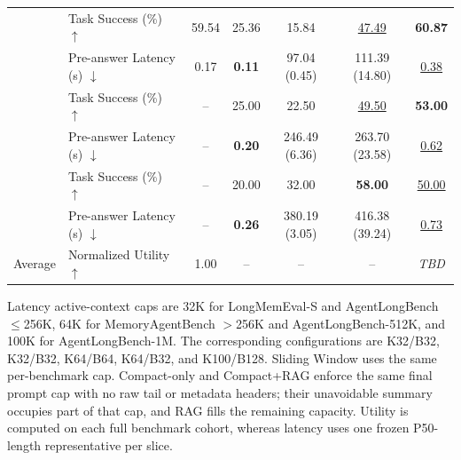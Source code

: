 \begin{table}[t]
\begin{tabular}{@{}llccccc@{}}
& Task Success (\%) $\uparrow$
& 59.54 & 25.36 & 15.84 & \underline{47.49} & \textbf{60.87} \\
& Pre-answer Latency (s) $\downarrow$
& 0.17 & \textbf{0.11} & 97.04 (0.45) & 111.39 (14.80) & \underline{0.38} \\
\midrule

& Task Success (\%) $\uparrow$
& -- & 25.00 & 22.50 & \underline{49.50} & \textbf{53.00} \\
& Pre-answer Latency (s) $\downarrow$
& -- & \textbf{0.20} & 246.49 (6.36) & 263.70 (23.58) & \underline{0.62} \\
\midrule

& Task Success (\%) $\uparrow$
& -- & 20.00 & 32.00 & \textbf{58.00} & \underline{50.00} \\
& Pre-answer Latency (s) $\downarrow$
& -- & \textbf{0.26} & 380.19 (3.05) & 416.38 (39.24) & \underline{0.73} \\
\midrule

Average
& Normalized Utility $\uparrow$
& 1.00 & -- & -- & -- & \textit{TBD} \\

\bottomrule
\end{tabular}

\vspace{2pt}
\parbox{\textwidth}{\footnotesize
Latency active-context caps are 32K for LongMemEval-S and AgentLongBench
$\leq$256K, 64K for MemoryAgentBench $>$256K and AgentLongBench-512K, and
100K for AgentLongBench-1M. The corresponding \sys{} configurations are
K32/B32, K32/B32, K64/B64, K64/B32, and K100/B128. Sliding Window uses the
same per-benchmark cap. Compact-only and Compact+RAG enforce the same final
prompt cap with no raw tail or metadata headers; their unavoidable summary
occupies part of that cap, and RAG fills the remaining capacity. Utility is
computed on each full benchmark cohort, whereas latency uses one frozen
P50-length representative per slice.}
\end{table}
